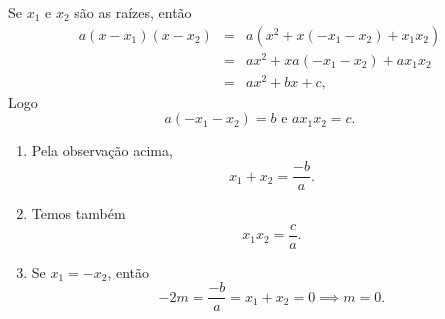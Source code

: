 Se $x_1$ e $x_2$ são as raízes, então
\begin{eqnarray*}
	a(x-x_1)(x-x_2)
	& = & a(x^2+x(-x_1-x_2)+x_1x_2)\\
	& = & ax^2+xa(-x_1-x_2)+ax_1x_2\\
	& = & ax^2+bx+c,
\end{eqnarray*}
Logo
\[
	a(-x_1-x_2)=b\mbox{ e }ax_1x_2=c.
\]

\begin{enumerate}
	\item Pela observação acima,
	\[
		x_1+x_2=\frac{-b}{a}.
	\]
	\item Temos também
	\[
		x_1x_2=\frac{c}{a}.
	\]
	\item Se $x_1=-x_2$, então
	\[
		-2m=\frac{-b}{a}=x_1+x_2=0\implies m=0.
	\]
\end{enumerate}
